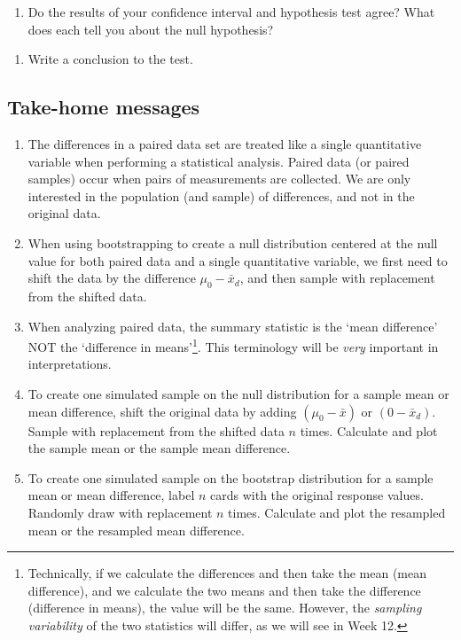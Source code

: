 \documentclass[
]{report}
\providecommand{\tightlist}{%
  \setlength{\itemsep}{0pt}\setlength{\parskip}{0pt}}
\begin{document}
\vspace{0.7in}

\begin{enumerate}
\def\labelenumi{\arabic{enumi}.}
\setcounter{enumi}{9}
\tightlist
\item
  Do the results of your confidence interval and hypothesis test agree? What does each tell you about the null hypothesis?
\end{enumerate}

\vspace{.7in}

\begin{enumerate}
\def\labelenumi{\arabic{enumi}.}
\setcounter{enumi}{10}
\tightlist
\item
  Write a conclusion to the test.
\end{enumerate}

\vspace{0.8in}

\subsection{Take-home messages}\label{take-home-messages-19}

\begin{enumerate}
\def\labelenumi{\arabic{enumi}.}
\item
  The differences in a paired data set are treated like a single quantitative variable when performing a statistical analysis. Paired data (or paired samples) occur when pairs of measurements are collected. We are only interested in the population (and sample) of differences, and not in the original data.
\item
  When using bootstrapping to create a null distribution centered at the null value for both paired data and a single quantitative variable, we first need to shift the data by the difference \(\mu_0 - \bar{x}_d\), and then sample with replacement from the shifted data.
\item
  When analyzing paired data, the summary statistic is the `mean difference' NOT the `difference in means'\footnote{Technically, if we calculate the differences and then take the mean (mean difference), and we calculate the two means and then take the difference (difference in means), the value will be the same. However, the \emph{sampling variability} of the two statistics will differ, as we will see in Week 12.}. This terminology will be \emph{very} important in interpretations.
\item
  To create one simulated sample on the null distribution for a sample mean or mean difference, shift the original data by adding \((\mu_0 - \bar{x})\) or \((0 - \bar{x}_d)\). Sample with replacement from the shifted data \(n\) times. Calculate and plot the sample mean or the sample mean difference.
\item
  To create one simulated sample on the bootstrap distribution for a sample mean or mean difference, label \(n\) cards with the original response values. Randomly draw with replacement \(n\) times. Calculate and plot the resampled mean or the resampled mean difference.
\end{enumerate}
\end{document}
